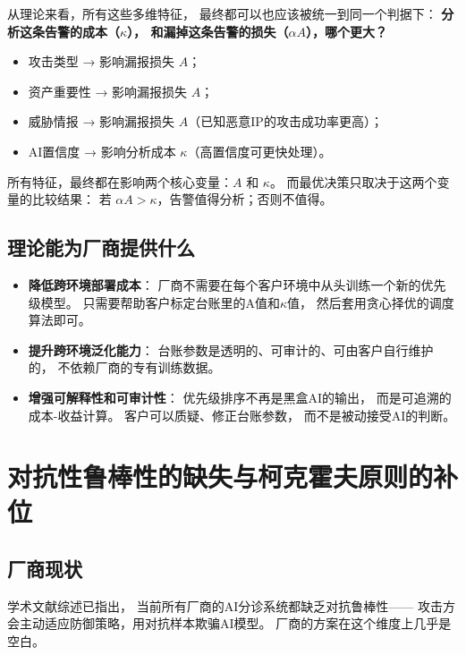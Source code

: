 \documentclass[11pt,a4paper]{article}
\begin{document}
从理论来看，所有这些多维特征，
最终都可以也应该被统一到同一个判据下：
\textbf{分析这条告警的成本（\(\kappa\)），
和漏掉这条告警的损失（\(\alpha A\)），哪个更大？}

\begin{itemize}
    \item 攻击类型 → 影响漏报损失 \(A\)；
    \item 资产重要性 → 影响漏报损失 \(A\)；
    \item 威胁情报 → 影响漏报损失 \(A\)（已知恶意IP的攻击成功率更高）；
    \item AI置信度 → 影响分析成本 \(\kappa\)（高置信度可更快处理）。
\end{itemize}

所有特征，最终都在影响两个核心变量：\(A\) 和 \(\kappa\)。
而最优决策只取决于这两个变量的比较结果：
若 \(\alpha A > \kappa\)，告警值得分析；否则不值得。

\subsection{理论能为厂商提供什么}

\begin{itemize}
    \item \textbf{降低跨环境部署成本}：
          厂商不需要在每个客户环境中从头训练一个新的优先级模型。
          只需要帮助客户标定台账里的A值和\(\kappa\)值，
          然后套用贪心择优的调度算法即可。
    \item \textbf{提升跨环境泛化能力}：
          台账参数是透明的、可审计的、可由客户自行维护的，
          不依赖厂商的专有训练数据。
    \item \textbf{增强可解释性和可审计性}：
          优先级排序不再是黑盒AI的输出，
          而是可追溯的成本-收益计算。
          客户可以质疑、修正台账参数，
          而不是被动接受AI的判断。
\end{itemize}

\section{对抗性鲁棒性的缺失与柯克霍夫原则的补位}

\subsection{厂商现状}

学术文献综述已指出，
当前所有厂商的AI分诊系统都缺乏对抗鲁棒性——
攻击方会主动适应防御策略，用对抗样本欺骗AI模型。
厂商的方案在这个维度上几乎是空白。
\end{document}
